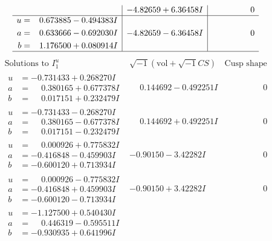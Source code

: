 \documentclass[1p]{elsarticle_modified}
\theoremstyle{definition}
\newcommand{\I}{\sqrt{-1}}
\begin{document}
$$\begin{array}{c|c|c}
 & -4.82659 + 6.36458 I & \phantom{-0.000000 } 0 \\ \hline\begin{aligned}
u &= \phantom{-}0.673885 - 0.494383 I \\
a &= \phantom{-}0.633666 - 0.692030 I \\
b &= \phantom{-}1.176500 + 0.080914 I\end{aligned}
 & -4.82659 - 6.36458 I & \phantom{-0.000000 } 0\\
 \hline 
 \end{array}$$\newpage$$\begin{array}{c|c|c}  
\text{Solutions to }I^u_{1}& \I (\text{vol} + \sqrt{-1}CS) & \text{Cusp shape}\\
 \hline 
\begin{aligned}
u &= -0.731433 + 0.268270 I \\
a &= \phantom{-}0.380165 + 0.677378 I \\
b &= \phantom{-}0.017151 + 0.232479 I\end{aligned}
 & \phantom{-}0.144692 - 0.492251 I & \phantom{-0.000000 } 0 \\ \hline\begin{aligned}
u &= -0.731433 - 0.268270 I \\
a &= \phantom{-}0.380165 - 0.677378 I \\
b &= \phantom{-}0.017151 - 0.232479 I\end{aligned}
 & \phantom{-}0.144692 + 0.492251 I & \phantom{-0.000000 } 0 \\ \hline\begin{aligned}
u &= \phantom{-}0.000926 + 0.775832 I \\
a &= -0.416848 - 0.459903 I \\
b &= -0.600120 + 0.713934 I\end{aligned}
 & -0.90150 - 3.42282 I & \phantom{-0.000000 } 0 \\ \hline\begin{aligned}
u &= \phantom{-}0.000926 - 0.775832 I \\
a &= -0.416848 + 0.459903 I \\
b &= -0.600120 - 0.713934 I\end{aligned}
 & -0.90150 + 3.42282 I & \phantom{-0.000000 } 0 \\ \hline\begin{aligned}
u &= -1.127500 + 0.540430 I \\
a &= \phantom{-}0.446319 - 0.595511 I \\
b &= -0.930935 + 0.641996 I\end{aligned}

\end{array}$$
\end{document}
